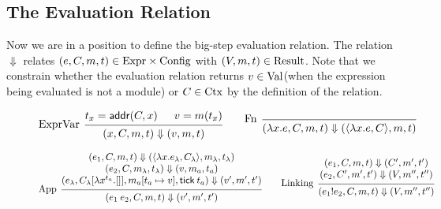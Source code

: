 \documentclass[acmsmall,screen]{acmart}
\theoremstyle{definition}
\newcommand*{\Expr}{\text{Expr}}
\newcommand*{\Time}{\mathbb{T}}
\newcommand*{\Ctx}[1]{\text{Ctx}\vphantom{#1}}
\newcommand*{\Value}[1]{\text{Val}\vphantom{#1}}
\newcommand*{\mem}{m}
\newcommand*{\Config}[1]{\text{Config}\vphantom{#1}}
\newcommand*{\Result}[1]{\text{Result}\vphantom{#1}}
\newcommand*{\link}[2]{{#1}\mathtt{!}{#2}}
\newcommand*{\addr}{\mathsf{addr}}
\newcommand*{\tick}{\mathsf{tick}}
\begin{document}
\subsection{The Evaluation Relation}

Now we are in a position to define the big-step evaluation relation.
The relation $\Downarrow$ relates $(e,C,\mem,t)\in\Expr\times\Config{\Time}$ with
$(V,\mem,t)\in\Result{\Time}$.
Note that we constrain whether the evaluation relation returns $v\in\Value{\Time}$(when the expression being evaluated is not a module) or $C\in\Ctx{\Time}$ by the definition of the relation.

\begin{figure}[htb]
  \footnotesize
  \[
    \begin{prooftree}
      \hypo{t_{x}=\addr(C,x)}
      \hypo{v=\mem(t_{x})}
      \infer[left label=ExprVar]2{
      (x, C, \mem, t)
      \Downarrow
      (v, \mem, t)
      }
    \end{prooftree}\qquad
    \begin{prooftree}
      \infer[left label=Fn]0{
      (\lambda x.e, C, \mem, t)
      \Downarrow
      (\langle\lambda x.e, C\rangle, \mem, t)
      }
    \end{prooftree}
  \]

  \[
    \begin{prooftree}
      \hypo{
        \begin{matrix}
          (e_{1}, C, \mem, t)
          \Downarrow
          (\langle\lambda x.e_{\lambda}, C_{\lambda}\rangle, \mem_{\lambda}, t_{\lambda}) \\
          (e_{2}, C, \mem_{\lambda}, t_{\lambda})
          \Downarrow
          (v, \mem_{a}, t_{a})                                                            \\
          (e_{\lambda}, C_{\lambda}[\lambda x^{t_{a}}.[]], \mem_{a}[t_{a}\mapsto v], \tick\:t_{a})
          \Downarrow
          (v', \mem',t')
        \end{matrix}
      }
      \infer[left label={App}]1{
      (e_{1}\:e_{2}, C, \mem, t)
      \Downarrow
      (v', \mem',t')
      }
    \end{prooftree}\qquad
    \begin{prooftree}
      \hypo{
        \begin{matrix}
          (e_{1}, C, \mem, t)
          \Downarrow
          (C', \mem', t') \\
          (e_{2}, C', \mem', t')
          \Downarrow
          (V, \mem'', t'')
        \end{matrix}
      }
      \infer[left label=Linking]1{
      (\link{e_{1}}{e_{2}}, C, \mem, t)
      \Downarrow
      (V, \mem'', t'')
      }
    \end{prooftree}
  \]


\end{figure}
\end{document}
